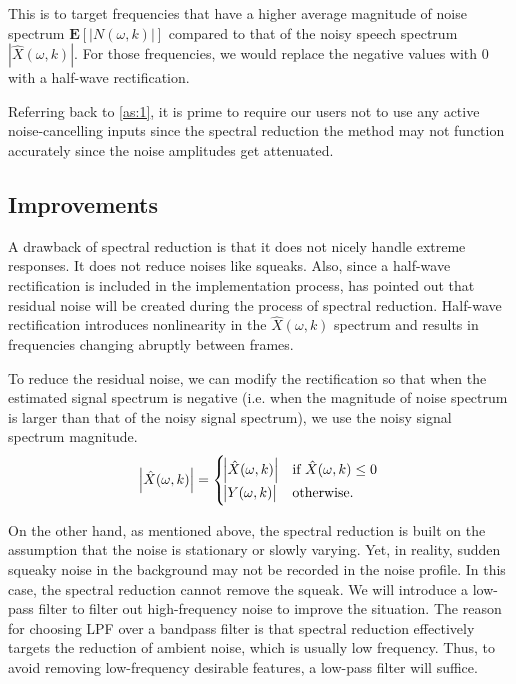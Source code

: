 This is to target frequencies that have a higher average magnitude of noise spectrum $\textbf{E}[|N(\omega,k)|]$ compared to that of 
the noisy speech spectrum $|\hat{X}(\omega,k)|$. For those frequencies, we would replace the negative values with 0 with a half-wave 
rectification.

Referring back to \cref{as:1}, it is prime to require our users not to use any active noise-cancelling inputs since the spectral reduction
the method may not function accurately since the noise amplitudes get attenuated.

\subsection{Improvements}
A drawback of spectral reduction is that it does not nicely handle extreme responses. It does not reduce noises like
squeaks. Also, since a half-wave rectification is included in the implementation process, \cite{spectral_drawback} has 
pointed out that residual noise will be created during the process of spectral reduction. Half-wave rectification introduces
nonlinearity in the $\hat{X}(\omega,k)$ spectrum and results in frequencies changing abruptly between frames.

To reduce the residual noise, we can modify the rectification so that when the estimated 
signal spectrum is negative (i.e. when the magnitude of noise spectrum is larger than that of the 
noisy signal spectrum), we use the noisy signal spectrum magnitude.
\begin{equation}
    \abs{\hat{X}(\omega,k)} = \begin{cases}
        \abs{\hat{X}(\omega,k)}   & \text{if } \hat{X}(\omega,k) \leq 0\\
        \abs{Y(\omega,k)}                   & \text{otherwise.}
    \end{cases}
\end{equation}

On the other hand, as mentioned above, the spectral reduction is built on the assumption that the noise is stationary or slowly varying. Yet, in reality,
sudden squeaky noise in the background may not be recorded in the noise profile. In this case, the spectral reduction 
cannot remove the squeak. We will introduce a low-pass filter to filter out high-frequency noise to improve the situation. The reason
for choosing LPF over a bandpass filter is that spectral reduction effectively targets the reduction of ambient noise, which is
 usually low frequency. Thus, to avoid removing low-frequency desirable features, a low-pass filter will suffice.

